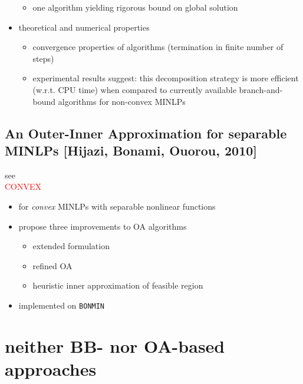 \documentclass{article}
\begin{document}
\begin{itemize}
\begin{itemize}
	\item one algorithm yielding rigorous bound on global solution
	\end{itemize}
\item theoretical and numerical properties
	\begin{itemize}
	\item convergence properties of algorithms (termination in finite number of steps)
	\item experimental results suggest: this decomposition strategy is more efficient (w.r.t. CPU time) when compared to currently available branch-and-bound algorithms for non-convex MINLPs
	\end{itemize}
\end{itemize}

\subsection{An Outer-Inner Approximation for separable MINLPs [Hijazi, Bonami, Ouorou, 2010]}
see \cite{hijazi2010outer}\\
\textcolor{red}{CONVEX}
\begin{itemize}

\item for \emph{convex} MINLPs with separable nonlinear functions
\item propose three improvements to OA algorithms
	\begin{itemize}
	\item extended formulation
	\item refined OA
	\item heuristic inner approximation of feasible region
	\end{itemize}
\item implemented on \texttt{BONMIN}
\end{itemize}

\newpage
\section{neither BB- nor OA-based approaches}
\end{document}
